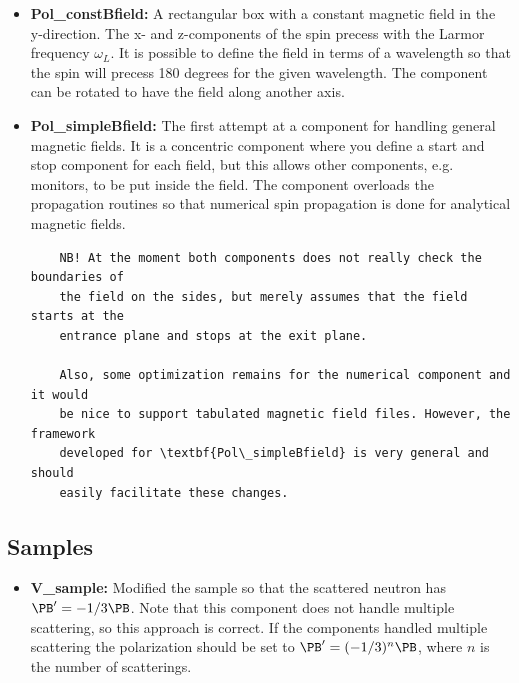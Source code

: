 \begin{itemize}
\item \textbf{Pol\_constBfield:} A rectangular box with a constant magnetic
  field in the y-direction. The x- and z-components of the spin precess with
  the Larmor frequency $\omega_L$. It is possible to define the field in terms
  of a wavelength so that the spin will precess 180 degrees for the given
  wavelength. The component can be rotated to have the field along another
  axis. \\

\item \textbf{Pol\_simpleBfield:} The first attempt at a component for
  handling general magnetic fields. It is a concentric component where you
  define a start and stop component for each field, but this allows other
  components, e.g. monitors, to be put inside the field. The component
  overloads the propagation routines so that numerical spin propagation is
  done for analytical magnetic fields.

  \begin{lstlisting}
    NB! At the moment both components does not really check the boundaries of
    the field on the sides, but merely assumes that the field starts at the
    entrance plane and stops at the exit plane.

    Also, some optimization remains for the numerical component and it would
    be nice to support tabulated magnetic field files. However, the framework
    developed for \textbf{Pol\_simpleBfield} is very general and should
    easily facilitate these changes.
  \end{lstlisting}

\end{itemize}


\subsection{Samples}

\begin{itemize}
\item \textbf{V\_sample:} Modified the sample so that the scattered
  neutron has $\PB' = -1/3\PB$. Note that this component does not
  handle multiple scattering, so this approach is correct. If the
  components handled multiple scattering the polarization should be
  set to $\PB' = (-1/3)^n\PB$, where $n$ is the number of
  scatterings.\\
\end{itemize}


